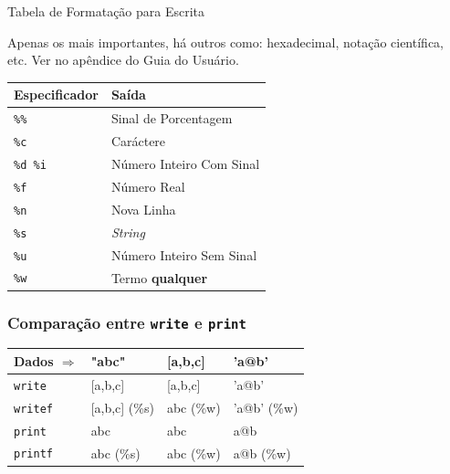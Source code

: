 \begin{frame}
{Tabela de Formatação para Escrita}

Apenas os mais importantes, há outros como: hexadecimal, notação científica,
etc. Ver no apêndice do Guia do Usuário.    
\begin{table}[h]
    \begin{tabular}{l|l}
        \hline  \hline
        \textbf{Especificador} & \textbf{Saída} \\
        \hline 
        \hline 
        \texttt{\%\%} & Sinal de Porcentagem \\
        \texttt{\%c} & Caráctere \\
        \texttt{\%d \%i} & Número Inteiro Com Sinal \\
        \texttt{\%f} & Número Real \\
        \texttt{\%n} & Nova Linha \\
        \texttt{\%s} & \textit{String} \\
        \texttt{\%u} & Número Inteiro Sem Sinal \\
        \texttt{\%w} & Termo \textbf{qualquer} \\
        \hline   \hline
    \end{tabular}
\end{table}
\end{frame}


\begin{frame}

\frametitle{Comparação entre \texttt{write} e \texttt{print}}
     
\begin{table}[h]
    \centering
    \begin{tabular}{ l|l|l|l }
        \hline         \hline
        Dados $\Rightarrow$  & "abc" & [a,b,c] & 'a@b'\\
        \hline         \hline
        \texttt{write}   & [a,b,c] & [a,b,c] & 'a@b' \\
        \hline
        \texttt{writef}  & [a,b,c] (\%s) & abc (\%w) & 'a@b' (\%w) \\
        \hline
        \texttt{print}   & abc & abc & a@b \\
        \hline
        \texttt{printf}  & abc (\%s) & abc (\%w) & a@b (\%w) \\ 
        \hline \hline
    \end{tabular}
\end{table}

\end{frame}

